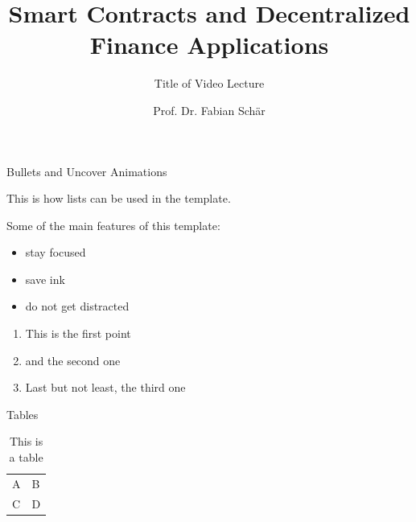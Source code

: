 \documentclass[]{beamer}
\title{Smart Contracts and Decentralized Finance Applications}
\subtitle{Title of Video Lecture}
\author{Prof. Dr. Fabian Schär}
\institute{University of Basel}
\begin{document}
\thispagestyle{empty}
\begin{frame}[noframenumbering]
	\titlepage
\end{frame}

\begin{frame}{Bullets and Uncover Animations}

This is how lists can be used in the template. \\ \vspace{1em}

Some of the main features of this template:
	
	\begin{itemize}
		\item<1-> stay focused
		\item<2-> save ink
		\item<3-> do not get distracted
	\end{itemize}

	\vspace{1em}	

	\begin{enumerate}
		\item<5-> This is the first point
		\item<6-> and the second one
		\item<7-> Last but not least, the third one
	\end{enumerate}
	
\end{frame}

\begin{frame}{Tables}
	\begin{table}
		\begin{tabular}{ll}
			A & B\\
			C & D
		\end{tabular}
		\caption{This is a table}
		\label{tbl:simpletable}
	\end{table}
\end{frame}

\end{document}
